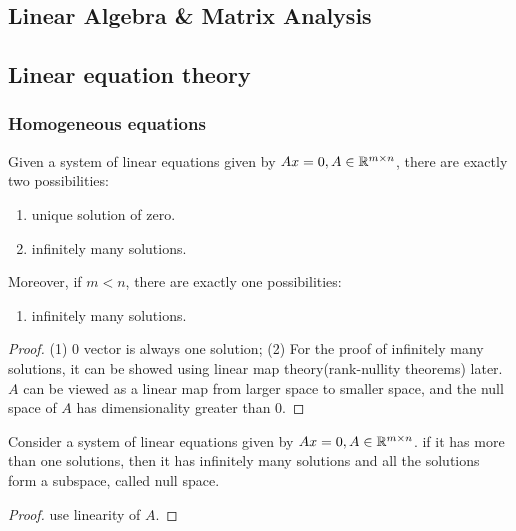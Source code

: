 \begin{refsection}
\startcontents[chapters]
\chapter{Linear Algebra \& Matrix Analysis}\label{ch:linearalgebra}

\section{Linear equation theory}\label{ch:linearalgebra:sec:linearequation}
\subsection{Homogeneous equations}
\begin{lemma}
Given a system of linear equations given by $Ax=0,A\in \mathbb{R}^{m\times n}$, there are exactly two possibilities:
\begin{enumerate}
    \item unique solution of zero.
    \item infinitely many solutions.
\end{enumerate}
Moreover, if $m<n$, there are exactly one possibilities:
\begin{enumerate}
    \item infinitely many solutions.
\end{enumerate}
\end{lemma}
\begin{proof}
(1) 0 vector is always one solution; (2) For the proof of infinitely many solutions, it can be showed using linear map theory(rank-nullity theorems) later. $A$ can be viewed as a linear map from larger space to smaller space, and the null space of $A$ has dimensionality greater than 0.
\end{proof}


\begin{lemma}
Consider a system of linear equations given by $Ax=0,A\in \mathbb{R}^{m\times n}$. if it has more than one solutions, then it has infinitely many solutions and all the solutions form a subspace, called null space.
\end{lemma}
\begin{proof}
use linearity of $A$.
\end{proof}






\end{refsection}
